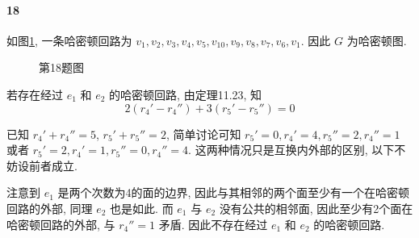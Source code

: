 \documentclass{ctexart}
\begin{document}
\newpage

\paragraph*{18} 如图\ref{fig:11.18}, 一条哈密顿回路为
$v_1,v_2,v_3,v_4,v_5,v_{10},v_9,v_8,v_7,v_6,v_1$.
因此 $G$ 为哈密顿图.

\begin{figure}[ht]
    \centering
    \caption{第18题图}
    \label{fig:11.18}
\end{figure}

若存在经过 $e_1$ 和 $e_2$ 的哈密顿回路, 由定理11.23, 知
\begin{equation*}
    2(r_4'-r_4'') + 3(r_5'-r_5'') = 0
\end{equation*}

已知 $r_4'+r_4''=5$, $r_5'+r_5''=2$, 简单讨论可知
$r_5'=0, r_4'=4, r_5''=2, r_4''=1$ 或者
$r_5'=2, r_4'=1, r_5''=0, r_4''=4$. 这两种情况只是互换内外部的区别,
以下不妨设前者成立.

注意到 $e_1$ 是两个次数为4的面的边界, 
因此与其相邻的两个面至少有一个在哈密顿回路的外部,
同理 $e_2$ 也是如此. 而 $e_1$ 与 $e_2$ 没有公共的相邻面,
因此至少有2个面在哈密顿回路的外部, 与 $r_4''=1$ 矛盾. 
因此不存在经过 $e_1$ 和 $e_2$ 的哈密顿回路.

\end{document}
